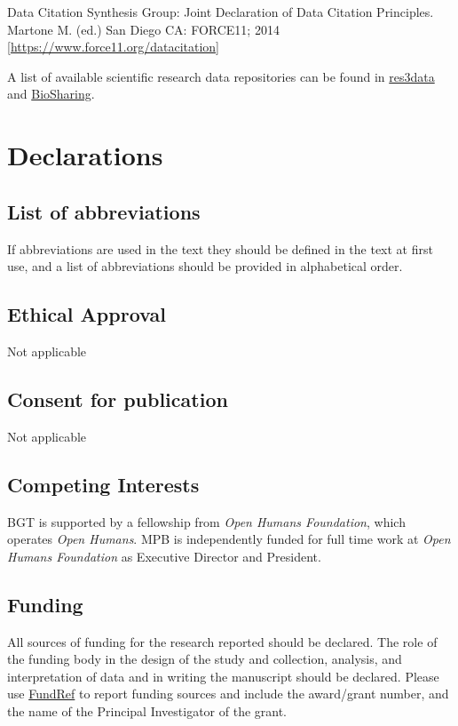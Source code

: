 \documentclass[a4paper,num-refs]{oup-contemporary}
\begin{document}
Data Citation Synthesis Group: Joint Declaration of Data Citation Principles. Martone M. (ed.) San Diego CA: FORCE11; 2014 [\url{https://www.force11.org/datacitation}]

A list of available scientific research data repositories can be found in \href{http://www.re3data.org/}{res3data} and \href{https://biosharing.org/}{BioSharing}.

\section{Declarations}

\subsection{List of abbreviations}
If abbreviations are used in the text they should be defined in the text at first use, and a list of abbreviations should be provided in alphabetical order.

\subsection{Ethical Approval}

Not applicable

\subsection{Consent for publication}
Not applicable

\subsection{Competing Interests}

BGT is supported by a fellowship from \textit{Open Humans Foundation}, which operates \textit{Open Humans}.
MPB is independently funded for full time work at \textit{Open Humans Foundation} as Executive Director and President.


\subsection{Funding}

All sources of funding for the research reported should be declared. The role of the funding body in the design of the study and collection, analysis, and interpretation of data and in writing the manuscript should be declared. Please use \href{http://www.crossref.org/fundingdata/}{FundRef} to report funding sources and include the award/grant number, and the name of the Principal Investigator of the grant. 
\end{document}
